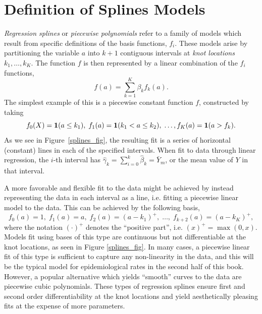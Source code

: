\section{Definition of Splines Models}

\emph{Regression splines} or \emph{piecewise polynomials} refer to a
family of models which result from specific definitions of the basis
functions, $f_i$. These models arise by partitioning the variable $a$
into $k+1$ contiguous intervals at \emph{knot locations} $k_1,
\dots, k_{K}$. The function $f$ is then represented by a linear combination of the $f_i$ functions,
\[
f(a) = \sum_{k=1}^K \beta_k f_k(a).
\]
The simplest example of this is a
piecewise constant function $f$, constructed by taking
\[
f_0(X) = \mathbf{1}(a \leq k_1),\; f_1(a)=\mathbf{1}(k_1 < a \leq k_2), \;
\ldots, f_{K}(a) = \mathbf{1}(a > f_k). 
\]
As we see in Figure~\ref{splines_fig}, the resulting fit is a series
of horizontal (constant) lines in each of the specified
intervals. When fit to data through linear regression, the $i$-th
interval has $\hat{\gamma}_k = \sum_{i=0}^k \hat{\beta}_k =
\bar{Y}_m$, or the mean value of $Y$ in that interval.

A more favorable and flexible fit to the data might be achieved by
instead representing the data in each interval as a line, i.e. fitting
a piecewise linear model to the data. This can be achieved by the
following basis, 
\[
f_0(a) = 1,\; f_1(a) = a,\; f_2(a) = (a-k_1)^+,\; \ldots,\;
f_{k+2}(a)=(a-k_K)^+,
\]
where the notation $(\cdot)^+$ denotes the ``positive part'',
i.e. $(x)^+ = \max(0, x)$. Models fit using bases of this type are
continuous but not differentiable at the knot locations, as seen in
Figure \ref{splines_fig}. In many cases, a piecewise linear fit of
this type is sufficient to capture any non-linearity in the data, and
this will be the typical model for epidemiological rates in the second
half of this book. However, a popular alternative which yields
``smooth'' curves to the data are piecewise cubic polynomials. These
types of regression splines ensure first and second order
differentiability at the knot locations and yield aesthetically
pleasing fits at the expense of more parameters.


